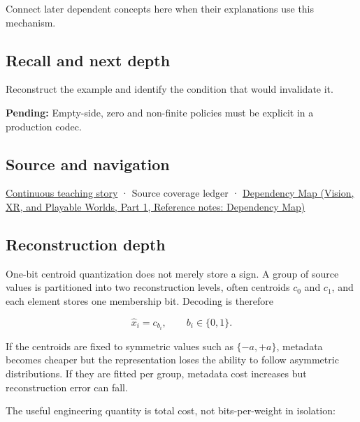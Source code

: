 Connect later dependent concepts here when their explanations use this mechanism.

\subsection{Recall and next depth}\label{appendix-4ccd7a775813-recall-and-next-depth}

\hypertarget{appendix-4ccd7a775813-recall-and-next-depth}{}

Reconstruct the example and identify the condition that would invalidate it.

\textbf{Pending:} Empty-side, zero and non-finite policies must be explicit in a production codec.

\subsection{Source and navigation}\label{appendix-4ccd7a775813-source-and-navigation}

\hypertarget{appendix-4ccd7a775813-source-and-navigation}{}

\hyperref[01-foundations-i-ch001-choosing-what-information-to-keep]{Continuous teaching story} · {Source coverage ledger} · \href{../07-Vision-XR-and-Playable-Worlds-P01/main.pdf\#appendix-4ad47bdd269a}{Dependency Map (Vision, XR, and Playable Worlds, Part 1, Reference notes: Dependency Map)}

\subsection{Reconstruction depth}\label{appendix-4ccd7a775813-reconstruction-depth}

\hypertarget{appendix-4ccd7a775813-reconstruction-depth}{}

One-bit centroid quantization does not merely store a sign. A group of source values is partitioned into two reconstruction levels, often centroids \(c_0\) and \(c_1\), and each element stores one membership bit. Decoding is therefore

\[
\hat x_i = c_{b_i},
\qquad b_i\in\{0,1\}.
\]

If the centroids are fixed to symmetric values such as \(\{-a,+a\}\), metadata becomes cheaper but the representation loses the ability to follow asymmetric distributions. If they are fitted per group, metadata cost increases but reconstruction error can fall.

The useful engineering quantity is total cost, not bits-per-weight in isolation:

